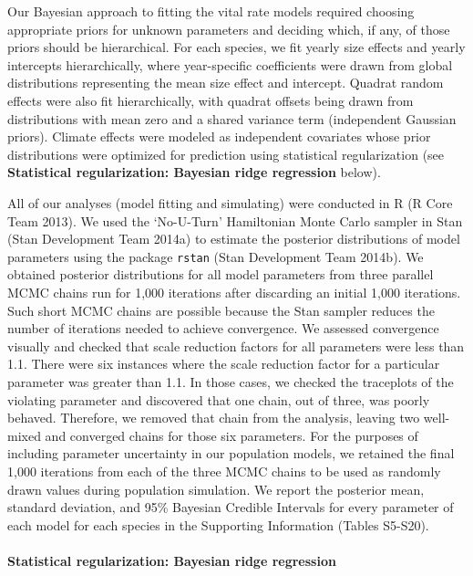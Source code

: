 \documentclass[12pt,]{article}
\begin{document}
Our Bayesian approach to fitting the vital rate models required choosing
appropriate priors for unknown parameters and deciding which, if any, of
those priors should be hierarchical. For each species, we fit yearly
size effects and yearly intercepts hierarchically, where year-specific
coefficients were drawn from global distributions representing the mean
size effect and intercept. Quadrat random effects were also fit
hierarchically, with quadrat offsets being drawn from distributions with
mean zero and a shared variance term (independent Gaussian priors).
Climate effects were modeled as independent covariates whose prior
distributions were optimized for prediction using statistical
regularization (see \textbf{Statistical regularization: Bayesian ridge
regression} below).

All of our analyses (model fitting and simulating) were conducted in R
(R Core Team 2013). We used the `No-U-Turn' Hamiltonian Monte Carlo
sampler in Stan (Stan Development Team 2014a) to estimate the posterior
distributions of model parameters using the package \texttt{rstan} (Stan
Development Team 2014b). We obtained posterior distributions for all
model parameters from three parallel MCMC chains run for 1,000
iterations after discarding an initial 1,000 iterations. Such short MCMC
chains are possible because the Stan sampler reduces the number of
iterations needed to achieve convergence. We assessed convergence
visually and checked that scale reduction factors for all parameters
were less than 1.1. There were six instances where the scale reduction
factor for a particular parameter was greater than 1.1. In those cases,
we checked the traceplots of the violating parameter and discovered that
one chain, out of three, was poorly behaved. Therefore, we removed that
chain from the analysis, leaving two well-mixed and converged chains for
those six parameters. For the purposes of including parameter
uncertainty in our population models, we retained the final 1,000
iterations from each of the three MCMC chains to be used as randomly
drawn values during population simulation. We report the posterior mean,
standard deviation, and 95\% Bayesian Credible Intervals for every
parameter of each model for each species in the Supporting Information
(Tables S5-S20).

\paragraph{Statistical regularization: Bayesian ridge
regression}\label{statistical-regularization-bayesian-ridge-regression}
\end{document}
